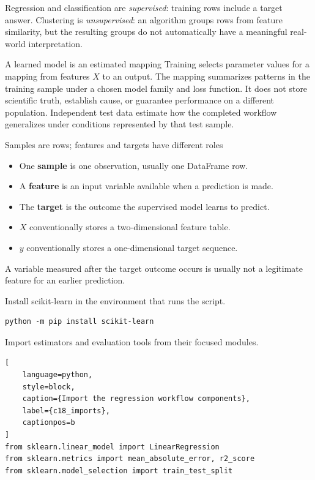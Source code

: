 Regression and classification are \emph{supervised}: training rows include a
target answer. Clustering is \emph{unsupervised}: an algorithm groups rows from
feature similarity, but the resulting groups do not automatically have a
meaningful real-world interpretation.

\begin{ExplainBox}{A learned model is an estimated mapping}
Training selects parameter values for a mapping from features $X$ to an output.
The mapping summarizes patterns in the training sample under a chosen model
family and loss function. It does not store scientific truth, establish cause,
or guarantee performance on a different population. Independent test data
estimate how the completed workflow generalizes under conditions represented
by that test sample.
\end{ExplainBox}

\begin{SyntaxBox}{Samples are rows; features and targets have different roles}
\begin{itemize}
    \item One \textbf{sample} is one observation, usually one DataFrame row.
    \item A \textbf{feature} is an input variable available when a prediction is made.
    \item The \textbf{target} is the outcome the supervised model learns to predict.
    \item $X$ conventionally stores a two-dimensional feature table.
    \item $y$ conventionally stores a one-dimensional target sequence.
\end{itemize}
A variable measured after the target outcome occurs is usually not a legitimate
feature for an earlier prediction.
\end{SyntaxBox}


Install scikit-learn in the environment that runs the script.

\begin{verbatim}
python -m pip install scikit-learn
\end{verbatim}

Import estimators and evaluation tools from their focused modules.

\begin{lstlisting}[
    language=python,
    style=block,
    caption={Import the regression workflow components},
    label={c18_imports},
    captionpos=b
]
from sklearn.linear_model import LinearRegression
from sklearn.metrics import mean_absolute_error, r2_score
from sklearn.model_selection import train_test_split
\end{lstlisting}

